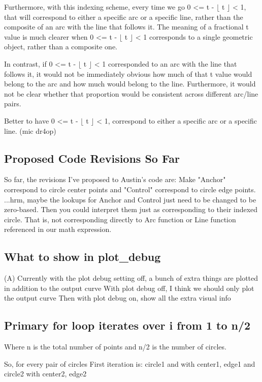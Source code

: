 \documentclass[sigconf]{acmart}
\begin{document}
Furthermore, with this indexing scheme, every time we go 0 <= t - $\lfloor$ t $\rfloor$ < 1, that will correspond to either a specific arc or a specific line, rather than the composite of an arc with the line that follows it. The meaning of a fractional t value is much clearer when 0 <= t - $\lfloor$ t $\rfloor$ < 1 corresponds to a single geometric object, rather than a composite one.

In contrast, if 0 <= t - $\lfloor$ t $\rfloor$ < 1 corresponded to an arc with the line that follows it, it would not be immediately obvious how much of that t value would belong to the arc and how much would belong to the line. Furthermore, it would not be clear whether that proportion would be consistent across different arc/line pairs.

Better to have 0 <= t - $\lfloor$ t $\rfloor$ < 1, correspond to either a specific arc or a specific line. (mic dr4op)

\subsection{Proposed Code Revisions So Far}
So far, the revisions I've proposed to Austin's code are:
Make "Anchor" correspond to circle center points and "Control" correspond to circle edge points.
...hrm, maybe the lookups for Anchor and Control just need to be changed to be zero-based. Then you could interpret them just as corresponding to their indexed circle. That is, not corresponding directly to Arc function or Line function referenced in our math expression.

\subsection{What to show in plot_debug}
(A) Currently with the plot debug setting off, a bunch of extra things are plotted in addition to the output curve
With plot debug off, I think we should only plot the output curve
Then with plot debug on, show all the extra visual info


\subsection{Primary for loop iterates over i from 1 to n/2}
Where n is the total number of points and n/2 is the number of circles.

So, for every pair of circles
First iteration is: circle1 and with center1, edge1 and circle2 with center2, edge2
\end{document}
